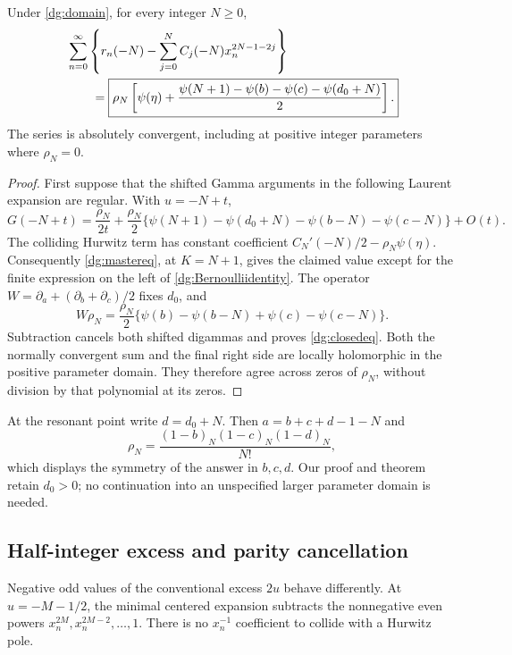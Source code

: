 \begin{theorem}\label{dg:closed}
Under \eqref{dg:domain}, for every integer $N\ge0$,
\begin{align}
 &\sum_{n=0}^{\infty}\left\{r_n(-N)-
             \sum_{j=0}^{N}C_j(-N)x_n^{2N-1-2j}\right\}\notag\\
 &\qquad=\boxed{\rho_N\left[
   \psi(\eta)+\frac{\psi(N+1)-\psi(b)-\psi(c)-\psi(d_0+N)}2
                    \right].}\label{dg:closedeq}
\end{align}
The series is absolutely convergent, including at positive integer
parameters where $\rho_N=0$.
\end{theorem}
\begin{proof}
First suppose that the shifted Gamma arguments in the following
Laurent expansion are regular. With $u=-N+t$,
\[
 G(-N+t)=\frac{\rho_N}{2t}
 +\frac{\rho_N}{2}
   \{\psi(N+1)-\psi(d_0+N)-\psi(b-N)-\psi(c-N)\}+O(t).
\]
The colliding Hurwitz term has constant coefficient
$C_N'(-N)/2-\rho_N\psi(\eta)$. Consequently
\eqref{dg:mastereq}, at $K=N+1$, gives the claimed value except for
the finite expression on the left of \eqref{dg:Bernoulliidentity}.
The operator $W=\partial_a+(\partial_b+\partial_c)/2$ fixes $d_0$, and
\[
 W\rho_N=\frac{\rho_N}{2}
   \{\psi(b)-\psi(b-N)+\psi(c)-\psi(c-N)\}.
\]
Subtraction cancels both shifted digammas and proves
\eqref{dg:closedeq}. Both the normally convergent sum and the final
right side are locally holomorphic in the positive parameter domain.
They therefore agree across zeros of $\rho_N$, without division by
that polynomial at its zeros.
\end{proof}

At the resonant point write $d=d_0+N$. Then
$a=b+c+d-1-N$ and
\[
 \rho_N=\frac{(1-b)_N(1-c)_N(1-d)_N}{N!},
\]
which displays the symmetry of the answer in $b,c,d$. Our proof and
theorem retain $d_0>0$; no continuation into an unspecified larger
parameter domain is needed.

\subsection{Half-integer excess and parity cancellation}
Negative odd values of the conventional excess $2u$ behave differently.
At $u=-M-1/2$, the minimal centered expansion subtracts the nonnegative
even powers $x_n^{2M},x_n^{2M-2},\ldots,1$. There is no $x_n^{-1}$
coefficient to collide with a Hurwitz pole.


